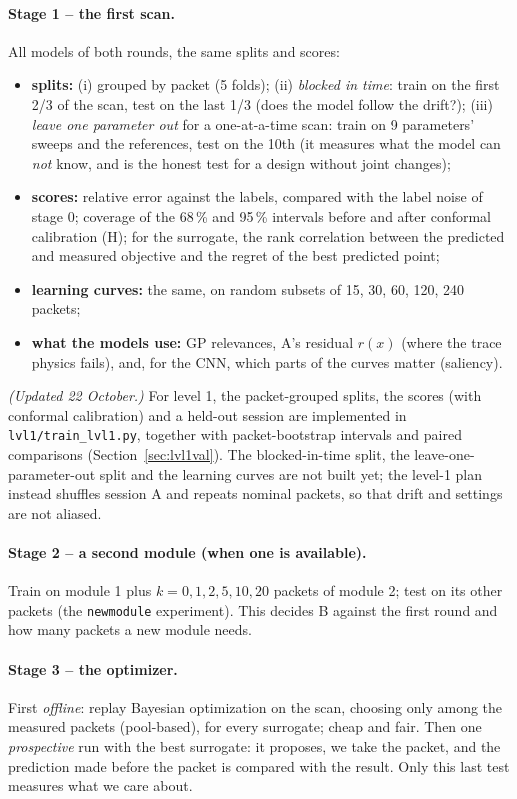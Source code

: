 \documentclass[10pt]{article}
\newcommand{\code}[1]{\texttt{#1}}
\begin{document}
\paragraph{Stage 1 -- the first scan.} All models of both rounds, the same splits and scores:
\begin{itemize}
\item \textbf{splits:} (i) grouped by packet (5 folds); (ii) \emph{blocked in time}: train on the first 2/3 of the scan, test on the last
  1/3 (does the model follow the drift?); (iii) \emph{leave one parameter out} for a one-at-a-time scan: train on 9 parameters' sweeps
  and the references, test on the 10th (it measures what the model can \emph{not} know, and is the honest test for a design without joint
  changes);
\item \textbf{scores:} relative error against the labels, compared with the label noise of stage 0; coverage of the 68\,\% and 95\,\%
  intervals before and after conformal calibration (H); for the surrogate, the rank correlation between the predicted and measured
  objective and the regret of the best predicted point;
\item \textbf{learning curves:} the same, on random subsets of 15, 30, 60, 120, 240 packets;
\item \textbf{what the models use:} GP relevances, A's residual $r(x)$ (where the trace physics fails), and, for the CNN, which parts of the
  curves matter (saliency).
\end{itemize}

\noindent\textit{(Updated 22 October.)} For level 1, the packet-grouped splits, the scores (with conformal calibration) and a held-out
session are implemented in \code{lvl1/train\_lvl1.py}, together with packet-bootstrap intervals and paired comparisons
(Section~\ref{sec:lvl1val}). The blocked-in-time split, the leave-one-parameter-out split and the learning curves are not built yet;
the level-1 plan instead shuffles session A and repeats nominal packets, so that drift and settings are not aliased.

\paragraph{Stage 2 -- a second module (when one is available).} Train on module 1 plus $k = 0, 1, 2, 5, 10, 20$ packets of module 2;
test on its other packets (the \code{newmodule} experiment). This decides B against the first round and how many packets a new module needs.

\paragraph{Stage 3 -- the optimizer.} First \emph{offline}: replay Bayesian optimization on the scan, choosing only among the measured
packets (pool-based), for every surrogate; cheap and fair. Then one \emph{prospective} run with the best surrogate: it proposes, we take the
packet, and the prediction made before the packet is compared with the result. Only this last test measures what we care about.
\end{document}

